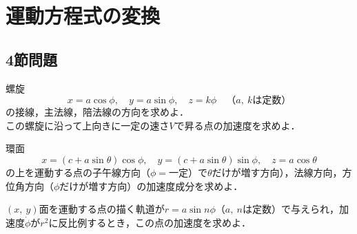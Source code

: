 \section{運動方程式の変換}
\subsection{4節問題}

\begin{enumerate}[label=\textbf{[\arabic*]}, labelsep=10pt, leftmargin=23pt]
	\item 螺旋
		\begin{equation*}
			x = a\cos \phi,\quad y = a\sin\phi,\quad z = k\phi \quad \text{（$a,\ k$は定数）}
		\end{equation*}
		の接線，主法線，陪法線の方向を求めよ．\\
		この螺旋に沿って上向きに一定の速さ$V$で昇る点の加速度を求めよ．
	\item 環面
		\begin{equation*}
			x = (c + a\sin\theta)\cos\phi,\quad y = (c + a\sin\theta)\sin\phi,\quad z = a\cos\theta
		\end{equation*}
		の上を運動する点の子午線方向（$\phi = \text{一定}$）で$\theta$だけが増す方向），法線方向，方位角方向（$\phi$だけが増す方向）の加速度成分を求めよ．
	\item $(x,\ y)$面を運動する点の描く軌道が$r = a\sin n\phi$（$a,\ n$は定数）で与えられ，加速度$\dot{\phi}$が$r^2$に反比例するとき，この点の加速度を求めよ．
\end{enumerate}



